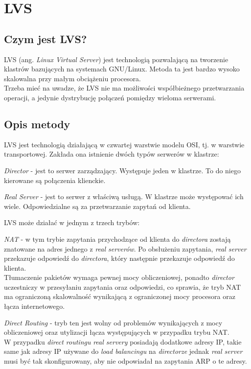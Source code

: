 {\section{LVS}
\subsection{Czym jest LVS?}
LVS (ang. \textit{Linux Virtual Server}) jest technologią pozwalającą na tworzenie klastrów bazujących na systemach GNU/Linux.
Metoda ta jest bardzo wysoko skalowalna przy małym obciążeniu procesora.\\
Trzeba mieć na uwadze, że LVS nie ma możliwości współbieżnego przetwarzania operacji, a jedynie dystrybucję połączeń pomiędzy wieloma serwerami.
\subsection{Opis metody}
LVS jest technologią działającą w czwartej warstwie modelu OSI, tj. w warstwie transportowej.
Zakłada ona istnienie dwóch typów serwerów w klastrze:
\begin{description}
	\item{\textit{Director}} - jest to serwer zarządzający. Występuje jeden w klastrze.
		To do niego kierowane są połączenia klienckie.
	\item{\textit{Real Server}} - jest to serwer z właściwą usługą. W klastrze może występować ich wiele.
		Odpowiedzialne są za przetwarzanie zapytań od klienta.
\end{description}
LVS może działać w jednym z trzech trybów:
\begin{description}
	\item{\textit{NAT}} - w tym trybie zapytania przychodzące od klienta do \textit{directora} zostają znatowane na adres jednego z \textit{real serverów}.
		Po obsłużeniu zapytania, \textit{real server} przekazuje odpowiedź do \textit{directora}, który następnie przekazuje odpowiedź do klienta.\\
		Tłumaczenie pakietów wymaga pewnej mocy obliczeniowej, ponadto \textit{director} uczestniczy w przesyłaniu zapytania oraz odpowiedzi, co sprawia, że tryb NAT ma ograniczoną skalowalność wynikającą z ograniczonej mocy procesora oraz łącza internetowego.
	\item{\textit{Direct Routing}} - tryb ten jest wolny od problemów wynikających z mocy obliczeniowej oraz utylizacji łącza występujących w przypadku trybu NAT.\\
	W przypadku \textit{direct routingu} \textit{real servery} posiadają dodatkowe adresy IP, takie same jak adresy IP używane do \textit{load balancingu} na \textit{directorze} jednak \textit{real server} musi być tak skonfigurowany, aby nie odpowiadał na zapytania ARP o te adresy.\\

\end{description}}
